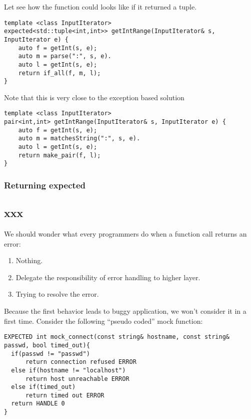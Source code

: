 \documentclass[a4paper,10pt]{article}
\begin{document}
Let see how the function could looks like if it returned a tuple.

\begin{lstlisting}
template <class InputIterator>
expected<std::tuple<int,int>> getIntRange(InputIterator& s, InputIterator e) {
    auto f = getInt(s, e);
    auto m = parse(":", s, e).
    auto l = getInt(s, e);
    return if_all(f, m, l);
}
\end{lstlisting}

Note that this is very close to the exception based solution

\begin{lstlisting}
template <class InputIterator>
pair<int,int> getIntRange(InputIterator& s, InputIterator e) {
    auto f = getInt(s, e);
    auto m = matchesString(":", s, e).
    auto l = getInt(s, e);       
    return make_pair(f, l);
}
\end{lstlisting}

\subsubsection{Returning expected}



\subsection{xxx}

We should wonder what every programmers do when a function call returns an error:

\begin{enumerate}
 \item Nothing.
 \item Delegate the responsibility of error handling to higher layer.
 \item Trying to resolve the error.
\end{enumerate}

Because the first behavior leads to buggy application, we won't consider it in a first time. Consider the following ``pseudo coded'' mock function:

\begin{lstlisting}
EXPECTED int mock_connect(const string& hostname, const string& passwd, bool timed_out){
  if(passwd != "passwd")
      return connection refused ERROR
  else if(hostname != "localhost")
      return host unreachable ERROR
  else if(timed_out)
      return timed out ERROR
  return HANDLE 0
}
\end{lstlisting}
\end{document}

